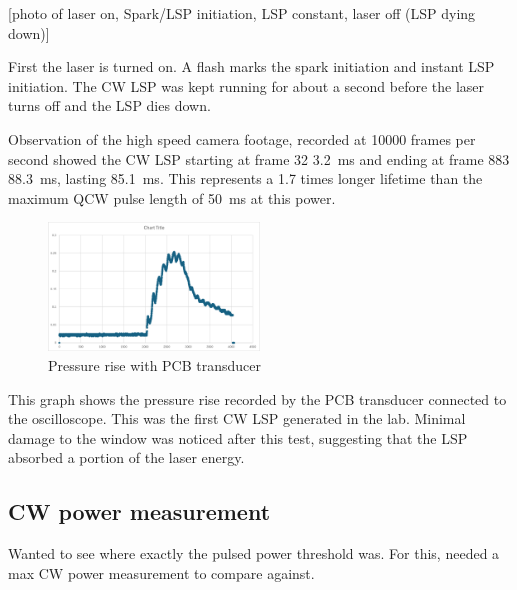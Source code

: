             [photo of laser on, Spark/LSP initiation, LSP constant, laser off (LSP dying down)]


            First the laser is turned on. A flash marks the spark initiation and instant LSP initiation. The CW LSP was kept running for about a second before the laser turns off and the LSP dies down.

            Observation of the high speed camera footage, recorded at 10000 frames per second showed the CW LSP starting at frame 32 \qty{3.2}{ms} and ending at frame 883 \qty{88.3}{ms}, lasting \qty{85.1}{ms}. This represents a 1.7 times longer lifetime than the maximum QCW pulse length of \qty{50}{ms} at this power.


            \begin{figure}[!ht]
                \centering
                \includegraphics[width=0.5\textwidth]{assets/4 experiments/CW pressure rise.png}
                \caption{Pressure rise with PCB transducer}
            \end{figure}

            This graph shows the pressure rise recorded by the PCB transducer connected to the oscilloscope. This was the first CW LSP generated in the lab.  Minimal damage to the window was noticed after this test, suggesting that the LSP absorbed a portion of the laser energy.

        \subsection{CW power measurement}

            Wanted to see where exactly the pulsed power threshold was. For this, needed a max CW power measurement to compare against. 
    
